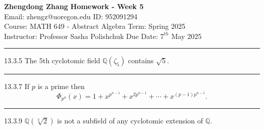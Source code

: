 \documentclass[a4paper, 12pt]{article}
\begin{document}
\noindent

\large\textbf{Zhengdong Zhang} \hfill \textbf{Homework - Week 5} \\
Email: zhengz@uoregon.edu \hfill ID: 952091294 \\
\normalsize Course: MATH 649 - Abstract Algebra \hfill Term: Spring 2025 \\
Instructor: Professor Sasha Polishchuk \hfill Due Date: $7^{th}$ May 2025 \\
\noindent\rule{7in}{2.8pt}

\begin{problem}{13.3.5}
The 5th cyclotomic field \(\mathbb{Q}(\zeta_5)\) contains \(\sqrt{5}\). 
\end{problem}
\begin{solution}

\end{solution}

\noindent\rule{7in}{2.8pt}
\begin{problem}{13.3.7}
If \(p\) is a prime then 
\[\Phi_{p^n}(x)=1+x^{p^{n-1}}+x^{2p^{n-1}}+\cdots+x^{(p-1)p^{n-1}}.\]
\end{problem}
\begin{solution}

\end{solution}

\noindent\rule{7in}{2.8pt}
\begin{problem}{13.3.9}
\(\mathbb{Q}(\sqrt[3]{2})\) is not a subfield of any cyclotomic extension of \(\mathbb{Q}\).
\end{problem}
\begin{solution}

\end{solution}
\end{document}
